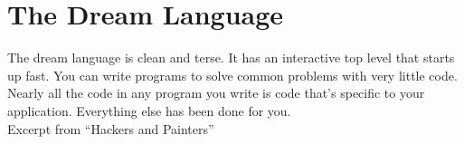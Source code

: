 \documentclass[12pt,hyperref=true,mathserif]{beamer}
\begin{document}
\section{The Dream Language}


\begin{frame}
% 
% 
The dream language is clean and terse. It has an interactive top level
that starts up fast. You can write programs to solve common problems
with very little code. Nearly all the code in any program you write is
code that's specific to your application. Everything else has been
done for you.\\
\hfill Excerpt from ``Hackers and Painters''
\end{frame}
\end{document}
